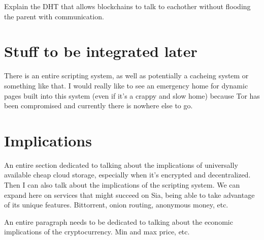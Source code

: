 \documentclass[twocolumn]{article}
\begin{document}
Explain the DHT that allows blockchains to talk to eachother without flooding the parent with communication.

\section{Stuff to be integrated later}

There is an entire scripting system, as well as potentially a cacheing system or something like that. I would really like to see an emergency home for dynamic pages built into this system (even if it's a crappy and slow home) because Tor has been compromised and currently there is nowhere else to go.

\section{Implications}

An entire section dedicated to talking about the implications of universally available cheap cloud storage, especially when it's encrypted and decentralized.
Then I can also talk about the implications of the scripting system.
We can expand here on services that might succeed on Sia, being able to take advantage of its unique features.
Bittorrent, onion routing, anonymous money, etc.

An entire paragraph needs to be dedicated to talking about the economic implications of the cryptocurrency.
Min and max price, etc.
\end{document}
